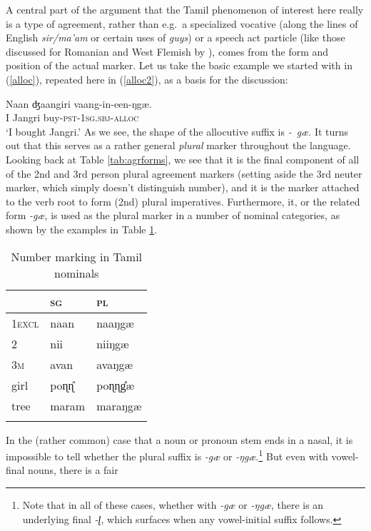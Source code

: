 \documentclass[output=paper, modfonts, nonflat]{langsci/langscibook}
\begin{document}
A central part of the argument that the Tamil phenomenon of interest
here really is a type of agreement, rather than e.g.\ a specialized
vocative (along the lines of English \textit{sir/ma'am} or certain
uses of \textit{guys}) or a speech act particle (like those discussed
for Romanian and West Flemish by \citealp{haegemanhill:2011}), comes
from the form and position of the actual marker. Let us take the basic
example we started with in (\ref{alloc}), repeated here in
(\ref{alloc2}), as a basis for the discussion:

\ea\label{alloc2}
\gll Naan ʤaangiri vaang-in-een-ŋgæ.\\
I Jangri buy-\textsc{pst}{}-1\textsc{sg}.\textsc{sbj}-\textsc{alloc}\\
\glt `I bought Jangri.'
\z
%
As we see, the shape of the allocutive suffix is \textit{-\ gæ}. It
turns out that this serves as a rather general \emph{plural} marker
throughout the language. Looking back at Table \ref{tab:agrforms}, we
see that it is the final component of all of the 2nd and 3rd person
plural agreement markers (setting aside the 3rd neuter marker, which
simply doesn't distinguish number), and it is the marker attached to
the verb root to form (2nd) plural imperatives. Furthermore, it, or
the related form \textit{-gæ}, is used as the plural marker in a
number of nominal categories, as shown by the examples in Table
\ref{tab:plnom}.
\begin{table}
  \caption{Number marking in Tamil nominals}
  \label{tab:plnom}
  \begin{tabularx}{\textwidth}{XXX} 
    \lsptoprule
    & \textsc{sg} & \textsc{pl}\\ 
    \midrule
    1\textsc{excl} & naan & naaŋgæ\\
    2 & nii & niiŋgæ\\
    3\textsc{m} & avan & avaŋgæ\\
    girl & poɳɳ\U & poɳɳ\U gæ\\
    tree & maram & maraŋgæ\\
    \lspbottomrule
  \end{tabularx}
\end{table}
In the (rather common) case that a noun or pronoun stem ends in a
nasal, it is impossible to tell whether the plural suffix is
\textit{-gæ} or \textit{-ŋgæ}.\footnote{Note that in all of these
  cases, whether with \textit{-gæ} or \textit{-ŋgæ}, there is an
  underlying final \textit{-ɭ}, which surfaces when any vowel-initial
  suffix follows.} But even with vowel-final nouns, there is a fair
\end{document}
